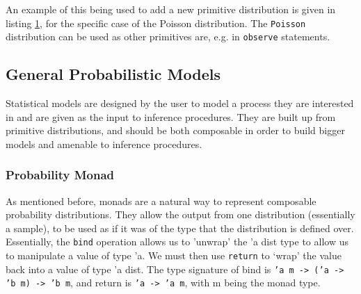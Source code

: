 \begin{figure}[!htb]
	\begin{minipage}{0.5\textwidth}
		\label{lst:prim-sig}
	\end{minipage}
	\begin{minipage}{0.5\textwidth}
		\label{lst:new-dist}
	\end{minipage}
\end{figure}
	
	
An example of this being used to add a new primitive distribution is given in listing \ref{lst:new-dist}, for the specific case of the Poisson distribution. The \texttt{Poisson} distribution can be used as other primitives are, e.g. in \texttt{observe} statements.
	
	
\subsection{General Probabilistic Models}
Statistical models are designed by the user to model a process they are interested in and are given as the input to inference procedures. They are built up from primitive distributions, and should be both composable in order to build bigger models and amenable to inference procedures.

\subsubsection{Probability Monad}
	
As mentioned before, monads are a natural way to represent composable probability distributions. They allow the output from one distribution (essentially a sample), to be used as if it was of the type that the distribution is defined over. Essentially, the \texttt{bind} operation allows us to 'unwrap' the 'a dist type to allow us to manipulate a value of type 'a. We must then use \texttt{return} to `wrap' the value back into a value of type 'a dist. The type signature of bind is \texttt{'a m -> ('a -> 'b m) -> 'b m}, and return is \texttt{'a -> 'a m}, with m being the monad type.
	
